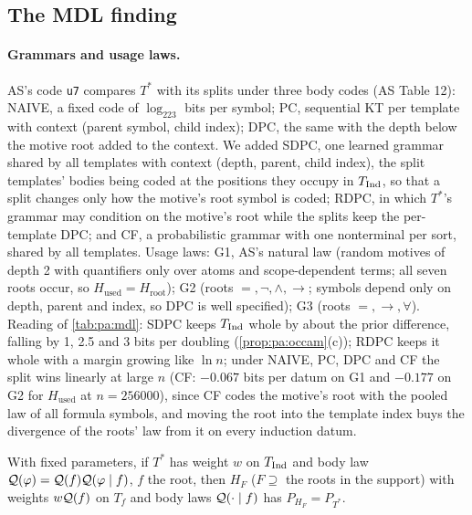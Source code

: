 \subsection{The MDL finding}\label{app:pa:mdl}

\paragraph{Grammars and usage laws.} AS's code \texttt{u7} compares $T^*$ with its splits under three body codes (AS Table 12): NAIVE, a fixed code of $\log_223$ bits per symbol; PC, sequential KT per template with context (parent symbol, child index); DPC, the same with the depth below the motive root added to the context. We added SDPC, one learned grammar shared by all templates with context (depth, parent, child index), the split templates' bodies being coded at the positions they occupy in $T_{\mathrm{Ind}}$, so that a split changes only how the motive's root symbol is coded; RDPC, in which $T^*$'s grammar may condition on the motive's root while the splits keep the per-template DPC; and CF, a probabilistic grammar with one nonterminal per sort, shared by all templates. Usage laws: G1, AS's natural law (random motives of depth 2 with quantifiers only over atoms and scope-dependent terms; all seven roots occur, so $H_{\mathrm{used}}=H_{\mathrm{root}}$); G2 (roots $=,\neg,\wedge,\to$; symbols depend only on depth, parent and index, so DPC is well specified); G3 (roots $=,\to,\forall$). Reading of \cref{tab:pa:mdl}: SDPC keeps $T_{\mathrm{Ind}}$ whole by about the prior difference, falling by 1, 2.5 and 3 bits per doubling (\cref{prop:pa:occam}(c)); RDPC keeps it whole with a margin growing like $\ln n$; under NAIVE, PC, DPC and CF the split wins linearly at large $n$ (CF: $-0.067$ bits per datum on G1 and $-0.177$ on G2 for $H_{\mathrm{used}}$ at $n=256000$), since CF codes the motive's root with the pooled law of all formula symbols, and moving the root into the template index buys the divergence of the roots' law from it on every induction datum.

\begin{proposition}\pabrk{}\label{prop:pa:chain}
With fixed parameters, if $T^*$ has weight $w$ on $T_{\mathrm{Ind}}$ and body law $\mathcal{Q}(\varphi)=\mathcal{Q}(f)\mathcal{Q}(\varphi\mid f)$, $f$ the root, then $H_F$ ($F\supseteq$ the roots in the support) with weights $w\mathcal{Q}(f)$ on $T_f$ and body laws $\mathcal{Q}(\cdot\mid f)$ has $P_{H_F}=P_{T^*}$.
\end{proposition}

